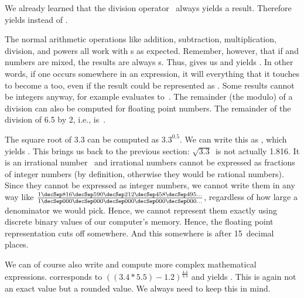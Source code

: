 We already learned that the division operator~\pythonilIdx{/} always yields a  result.
Therefore  yields  instead of .

The normal arithmetic operations like addition, subtraction, multiplication, division, and powers all work with s as expected.
Remember, however, that if  and  numbers are mixed, the results are always s.
Thus, \pythonIdx{+} gives us  and \pythonIdx{*} yields .
In other words, if one  occurs somewhere in an expression, it will  everything that it touches to become a  too, even if the result could be represented as .
Some results cannot be integers anyway, for example \pythonIdx{-} evaluates to~.
The remainder (the modulo) of a division can also be computed for floating point numbers.
The remainder of the division of 6.5 by 2, i.e., \expandafter{}\pythonIdx{\%} is~.%
%
\begin{sloppypar}%
The square root of 3.3 can be computed as $3.3^{0.5}$.
We can write this as \pythonIdx{**}, which yields .
This brings us back to the previous section:
$\sqrt{3.3}$~is not actually 1.816.
It is an irrational number~\cite{S1988WPCHD,B1991IWNT} and irrational numbers cannot be expressed as fractions of integer numbers (by definition, otherwise they would be rational numbers).
Since they cannot be expressed as integer numbers, we cannot write them in any way like $\frac{1\decSep816\decSep590\decSep212\decSep458\decSep495\dots}{1\decSep000\decSep000\decSep000\decSep000\decSep000\dots}$, regardless of how large a denominator we would pick.
Hence, we cannot represent them exactly using discrete binary values of our computer's memory.
Hence, the floating point representation cuts off somewhere.
And this somewhere is after 15~decimal places.%
\end{sloppypar}%
%
\begin{sloppypar}%
We can of course also write and compute more complex mathematical expressions.
 corresponds to $((3.4*5.5)-1.2)^{\frac{4.4}{3.3}}$ and yields .
This is again not an exact value but a rounded value.
We always need to keep this in mind.%
\end{sloppypar}%
